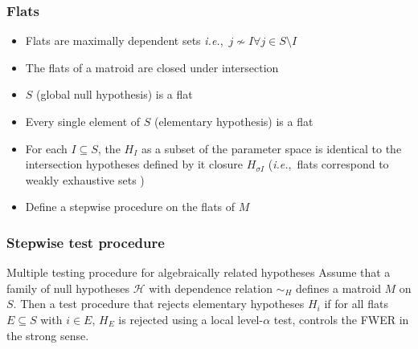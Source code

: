 \documentclass[bigger]{beamer}
\newcommand{\ie}{{\sl i.e.},~}
\begin{document}








\begin{frame}
\frametitle{Flats}
\begin{itemize}

\item Flats are maximally dependent sets \ie $j \nsim I \forall j \in
  S\setminus I$
\item The flats of a matroid are closed under intersection
\item $S$ (global null hypothesis) is a flat
\item Every single element of $S$ (elementary hypothesis) is a flat
\item For each $I \subseteq S$, the $H_I$ as a subset of the parameter
  space is identical to the intersection hypotheses defined by it
  closure $H_{\sigma I}$ (\ie flats correspond to weakly exhaustive
  sets \cite{bergmann1988improvements})
\item Define a stepwise procedure on the flats of $M$
\end{itemize} %
\end{frame}

\begin{frame}
 \frametitle{Stepwise test procedure}
 \begin{block}{Multiple testing procedure for algebraically related hypotheses}
   Assume that a family of null hypotheses $\mathscr{H}$ with
   dependence relation $\sim_H$ defines a matroid $M$ on $S$. Then a
   test procedure that rejects elementary hypotheses $H_i$ if for all
   flats $E \subseteq S$ with $i \in E$, $H_E$ is rejected using a
   local level-$\alpha$ test, controls the FWER in the strong sense.
 \end{block}

\end{frame}
\end{document}
